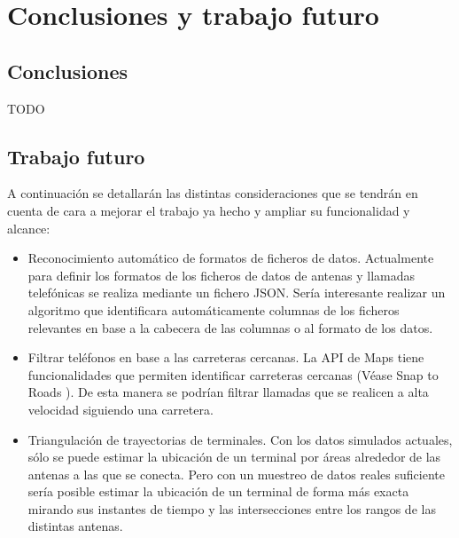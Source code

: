\chapter{Conclusiones y trabajo futuro\label{CAP:CONCTRAB}}
  \section{Conclusiones\label{SEC:CONCLUSIONES}}
    TODO
  \section{Trabajo futuro\label{SEC:TRABAJO}}
    A continuación se detallarán las distintas consideraciones que se tendrán en cuenta de cara a mejorar el trabajo ya hecho y ampliar su funcionalidad y alcance:
    
    \begin{itemize}
      \item Reconocimiento automático de formatos de ficheros de datos.
      Actualmente para definir los formatos de los ficheros de datos de antenas y llamadas telefónicas se realiza mediante un fichero JSON. 
      Sería interesante realizar un algoritmo que identificara automáticamente columnas de los ficheros relevantes en base a la cabecera de las columnas o al formato de los datos.
      
      \item Filtrar teléfonos en base a las carreteras cercanas. 
      La API de Maps tiene funcionalidades que permiten identificar carreteras cercanas (Véase Snap to Roads \cite{snaproad}). De esta manera se podrían filtrar llamadas que se realicen a alta velocidad siguiendo una carretera.
      
      \item Triangulación de trayectorias de terminales.
      Con los datos simulados actuales, sólo se puede estimar la ubicación de un terminal por áreas alrededor de las antenas a las que se conecta.
      Pero con un muestreo de datos reales suficiente sería posible estimar la ubicación de un terminal de forma más exacta mirando sus instantes de tiempo y las intersecciones entre los rangos de las distintas antenas. 
    \end{itemize}